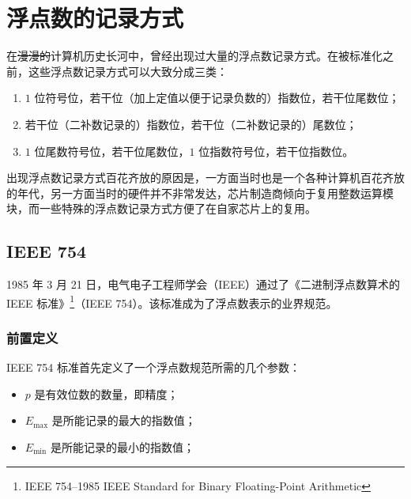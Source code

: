 \section{浮点数的记录方式}\label{sec:NumberSystemBasics/FloatingPointNotations}
    在\sout{漫漫的}计算机历史长河中，曾经出现过大量的浮点数记录方式。在被标准化之前，这些浮点数记录方式可以大致分成三类\cite{jjgsavard-2005}：
    \begin{enumerate}
        \item $1$ 位符号位，若干位（加上定值以便于记录负数的）指数位，若干位尾数位；
        \item 若干位（二补数记录的）指数位，若干位（二补数记录的）尾数位；
        \item $1$ 位尾数符号位，若干位尾数位，$1$ 位指数符号位，若干位指数位。
    \end{enumerate}
    出现浮点数记录方式百花齐放的原因是，一方面当时也是一个各种计算机百花齐放的年代，另一方面当时的硬件并不非常发达，芯片制造商倾向于复用整数运算模块，而一些特殊的浮点数记录方式方便了在自家芯片上的复用。

    \subsection{IEEE 754}\label{subsec:NumberSystemBasics/FloatingPointNotations/IEEE754}
        1985 年 3 月 21 日，电气电子工程师学会（IEEE）通过了《二进制浮点数算术的 IEEE 标准》\footnote{IEEE 754--1985 IEEE Standard for Binary Floating-Point Arithmetic\cite{ieee}}（IEEE 754）。该标准成为了浮点数表示的业界规范。

        \subsubsection{前置定义}\label{subsubsec:NumberSystemBasics/FloatingPointNotations/IEEE754/PreDefinitions}
            IEEE 754 标准首先定义了一个浮点数规范所需的几个参数：
            \begin{itemize}
                \item $p$ 是有效位数的数量，即精度；
                \item $E_{\max}$ 是所能记录的最大的指数值；
                \item $E_{\min}$ 是所能记录的最小的指数值；
            \end{itemize}

